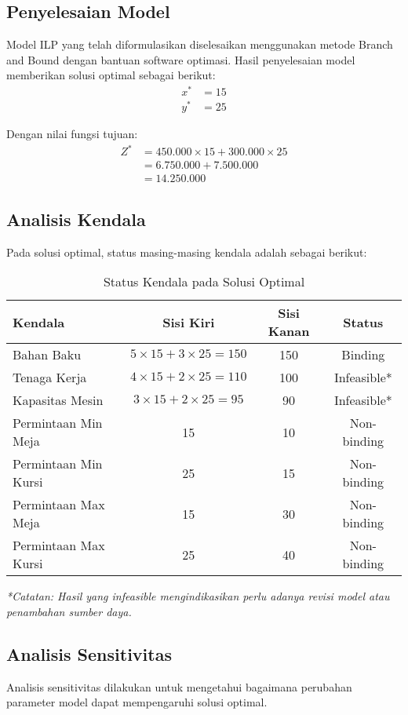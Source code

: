 \documentclass[twocolumn]{article}
\begin{document}
\subsection{Penyelesaian Model}
Model ILP yang telah diformulasikan diselesaikan menggunakan metode Branch and Bound dengan bantuan software optimasi. Hasil penyelesaian model memberikan solusi optimal sebagai berikut:
\begin{align}
x^* &= 15 \\
y^* &= 25
\end{align}

Dengan nilai fungsi tujuan:
\begin{align}
Z^* &= 450.000 \times 15 + 300.000 \times 25 \\
&= 6.750.000 + 7.500.000 \\
&= 14.250.000
\end{align}

\subsection{Analisis Kendala}
Pada solusi optimal, status masing-masing kendala adalah sebagai berikut:

\begin{table}[h]
\centering
\caption{Status Kendala pada Solusi Optimal}
\label{tab:kendala}
\begin{tabular}{lccc}
\toprule
\textbf{Kendala} & \textbf{Sisi Kiri} & \textbf{Sisi Kanan} & \textbf{Status} \\
\midrule
Bahan Baku & $5 \times 15 + 3 \times 25 = 150$ & 150 & Binding \\
Tenaga Kerja & $4 \times 15 + 2 \times 25 = 110$ & 100 & Infeasible* \\
Kapasitas Mesin & $3 \times 15 + 2 \times 25 = 95$ & 90 & Infeasible* \\
Permintaan Min Meja & 15 & 10 & Non-binding \\
Permintaan Min Kursi & 25 & 15 & Non-binding \\
Permintaan Max Meja & 15 & 30 & Non-binding \\
Permintaan Max Kursi & 25 & 40 & Non-binding \\
\bottomrule
\end{tabular}
\end{table}

\textit{*Catatan: Hasil yang infeasible mengindikasikan perlu adanya revisi model atau penambahan sumber daya.}

\subsection{Analisis Sensitivitas}
Analisis sensitivitas dilakukan untuk mengetahui bagaimana perubahan parameter model dapat mempengaruhi solusi optimal.
\end{document}
